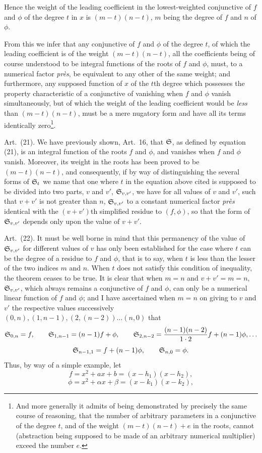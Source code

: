 \documentclass[11pt]{article}
\newcommand{\sourcepage}[1]{\marginpar{\scriptsize p.~#1}}
\newcommand{\art}[1]{\par\smallskip\noindent Art.~(#1).\quad}
\begin{document}
\sourcepage{468}
Hence the weight of the leading coefficient in the lowest-weighted conjunctive of $f$ and $\phi$ of the degree $t$ in $x$ is $(m-t)(n-t)$, $m$ being the degree of $f$ and $n$ of $\phi$.

From this we infer that any conjunctive of $f$ and $\phi$ of the degree $t$, of which the leading coefficient is of the weight $(m-t)(n-t)$, all the coefficients being of course understood to be integral functions of the roots of $f$ and $\phi$, must, to a numerical factor \emph{près}, be equivalent to any other of the same weight; and furthermore, any supposed function of $x$ of the $t$th degree which possesses the property characteristic of a conjunctive of vanishing when $f$ and $\phi$ vanish simultaneously, but of which the weight of the leading coefficient would be \emph{less} than $(m-t)(n-t)$, must be a mere nugatory form and have all its terms identically zero\footnote{And more generally it admits of being demonstrated by precisely the same course of reasoning, that the number of arbitrary parameters in a conjunctive of the degree $t$, and of the weight $(m-t)(n-t)+e$ in the roots, cannot (abstraction being supposed to be made of an arbitrary numerical multiplier) exceed the number $e$.}.

\art{21} We have previously shown, Art.~16, that $\mathfrak{S}$, as defined by equation (21), is an integral function of the roots $f$ and $\phi$, and vanishes when $f$ and $\phi$ vanish. Moreover, its weight in the roots has been proved to be $(m-t)(n-t)$, and consequently, if by way of distinguishing the several forms of $\mathfrak{S}_t$ we name that one where $t$ in the equation above cited is supposed to be divided into two parts, $v$ and $v'$, $\mathfrak{S}_{v,v'}$, we have for all values of $v$ and $v'$, such that $v+v'$ is not greater than $n$, $\mathfrak{S}_{v,v'}$ to a constant numerical factor \emph{près} identical with the $(v+v')$th simplified residue to $(f,\phi)$, so that the form of $\mathfrak{S}_{v,v'}$ depends only upon the value of $v+v'$.

\art{22} It must be well borne in mind that this permanency of the value of $\mathfrak{S}_{v,v'}$ for different values of $v$ has only been established for the case where $t$ can be the degree of a residue to $f$ and $\phi$, that is to say, when $t$ is less than the lesser of the two indices $m$ and $n$. When $t$ does not satisfy this condition of inequality, the theorem ceases to be true. It is clear that when $m=n$ and $v+v'=m=n$, $\mathfrak{S}_{v,v'}$, which always remains a conjunctive of $f$ and $\phi$, can only be a numerical linear function of $f$ and $\phi$; and I have ascertained when $m=n$ on giving to $v$ and $v'$ the respective values successively $(0,n),(1,n-1),(2,(n-2))\ldots(n,0)$ that
\[
\mathfrak{S}_{0,n}=f,
\qquad
\mathfrak{S}_{1,n-1}=(n-1)f+\phi,
\qquad
\mathfrak{S}_{2,n-2}=\frac{(n-1)(n-2)}{1\cdot2}f+(n-1)\phi,\ldots
\]
\[
\mathfrak{S}_{n-1,1}=f+(n-1)\phi,
\qquad
\mathfrak{S}_{n,0}=\phi.
\]
Thus, by way of a simple example, let
\[
f=x^2+ax+b=(x-h_1)(x-h_2),
\]
\[
\phi=x^2+\alpha x+\beta=(x-k_1)(x-k_2),
\]
\end{document}
